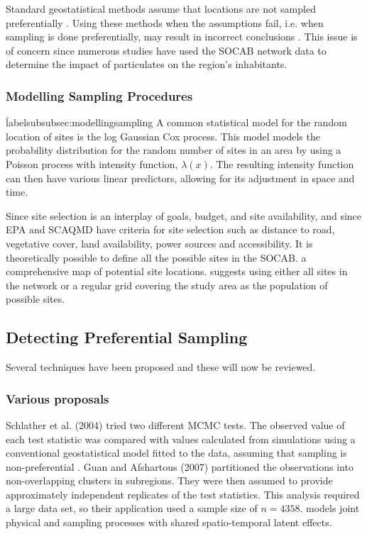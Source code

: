 Standard geostatistical methods assume that locations are not sampled preferentially \citep{diggle2010geostatistical}.  Using these methods when the assumptions fail, i.e. when sampling is done preferentially, may result in incorrect conclusions \citep{isaaks1988spatial}.  This issue is of concern since numerous studies have used the \ac{SOCAB} network data to determine the impact of particulates on the region's inhabitants.

\subsubsection*{Modelling Sampling Procedures}
\'label{subsubsec:modellingsampling}
A common statistical model for the random location of sites is the log Gaussian Cox process.  This model models the probability distribution for the random number of sites in an area by using a Poisson process with intensity function, $\lambda(x)$.  
The resulting intensity function can then have various linear predictors, allowing for its adjustment in space and time.

Since site selection is an interplay of goals, budget, and site availability, and since \ac{EPA} and \ac{SCAQMD} have criteria for site selection such as distance to road, vegetative cover, land availability, power sources and accessibility.  It is theoretically possible to define all the possible sites in the \ac{SOCAB}.  
a comprehensive map of potential site locations.  
\citet{watson2019} suggests using either all sites in the network or a regular grid covering the study area as the population of possible sites.  


\subsection{Detecting Preferential Sampling}
\label{subsec:prefsampdetection}
Several techniques have been proposed and these will now be reviewed.

\subsubsection*{Various proposals}
\label{subsubsec:various}
Schlather et al. (2004) tried two different MCMC tests.  The observed value of each test statistic was compared with values calculated from simulations using a conventional geostatistical model fitted to the data,  assuming that sampling is non-preferential \citep{schlather2004detecting}.  Guan and Afshartous (2007) partitioned the observations into non-overlapping clusters in subregions. They were then assumed to provide approximately independent replicates of the test statistics. This analysis required a large data set, so their application used a sample size of 
$ n = 4358 $.  
\cite{diggle10} models joint physical and sampling processes with shared spatio-temporal latent effects.

